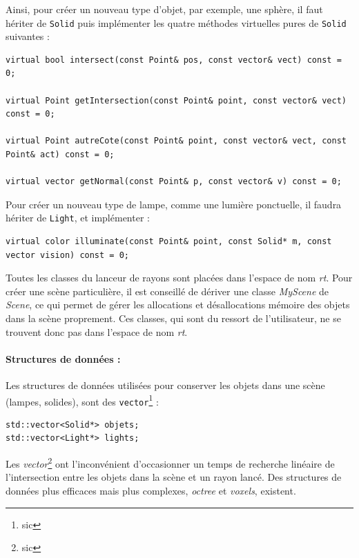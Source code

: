 Ainsi, pour créer un nouveau type d'objet, par exemple, une sphère, il faut hériter de \verb|Solid| puis implémenter les quatre méthodes virtuelles 
pures de \verb|Solid| suivantes :

\begin{lstlisting}
virtual bool intersect(const Point& pos, const vector& vect) const = 0;

virtual Point getIntersection(const Point& point, const vector& vect) const = 0;

virtual Point autreCote(const Point& point, const vector& vect,	const Point& act) const = 0;

virtual vector getNormal(const Point& p, const vector& v) const = 0;
\end{lstlisting}

Pour créer un nouveau type de lampe, comme une lumière ponctuelle, il faudra hériter de \verb|Light|, et implémenter :
\begin{lstlisting}
virtual color illuminate(const Point& point, const Solid* m, const vector vision) const = 0;
\end{lstlisting}

Toutes les classes du lanceur de rayons sont placées dans l'espace de nom \emph{rt}. Pour créer une scène particulière, il est
conseillé de dériver une classe \emph{MyScene}  de \emph{Scene}, ce qui permet de gérer les allocations et désallocations 
mémoire des objets dans la scène proprement. Ces classes, qui sont du ressort de l'utilisateur, ne se trouvent donc pas dans l'espace
 de nom \emph{rt}.

\paragraph{Structures de données : }
Les structures de données utilisées pour conserver les objets dans une scène (lampes, solides), sont des \verb|vector|\footnote{sic} : 
\begin{lstlisting}
std::vector<Solid*> objets;
std::vector<Light*> lights;
\end{lstlisting}
Les \emph{vector}\footnote{sic} ont l'inconvénient d'occasionner un temps de recherche linéaire de l'intersection entre les objets dans la scène et un rayon lancé. 
Des structures de données plus efficaces mais plus complexes, \emph{octree} et \emph{voxels}, existent.